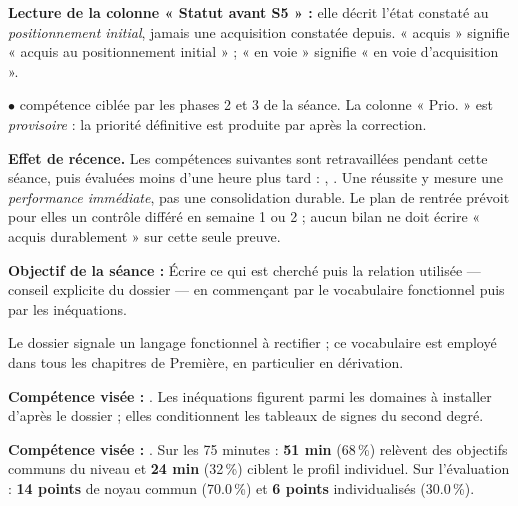 \documentclass[10pt,a4paper]{article}
\begin{document}
\par\vspace{1mm}\small\textbf{Lecture de la colonne « Statut avant S5 » :} elle décrit l'état constaté au \emph{positionnement initial}, jamais une acquisition constatée depuis. « acquis » signifie « acquis au positionnement initial » ; « en voie » signifie « en voie d'acquisition ».
\par\small$\bullet$ compétence ciblée par les phases 2 et 3 de la séance. La colonne « Prio. » est \emph{provisoire} : la priorité définitive est produite par  après la correction.
\begin{warningbox}\textbf{Effet de récence.} Les compétences suivantes sont retravaillées pendant cette séance, puis évaluées moins d'une heure plus tard : , . Une réussite y mesure une \emph{performance immédiate}, pas une consolidation durable. Le plan de rentrée prévoit pour elles un contrôle différé en semaine 1 ou 2 ; aucun bilan ne doit écrire « acquis durablement » sur cette seule preuve.\end{warningbox}
\begin{goalbox}\textbf{Objectif de la séance :} Écrire ce qui est cherché puis la relation utilisée — conseil explicite du dossier — en commençant par le vocabulaire fonctionnel puis par les inéquations.\end{goalbox}
Le dossier signale un langage fonctionnel à rectifier ; ce vocabulaire est employé dans tous les chapitres de Première, en particulier en dérivation.
\par\vspace{1mm}\textbf{Compétence visée :} .
Les inéquations figurent parmi les domaines à installer d'après le dossier ; elles conditionnent les tableaux de signes du second degré.
\par\vspace{1mm}\textbf{Compétence visée :} .
Sur les 75 minutes : \textbf{51 min} (68\,\%) relèvent des objectifs communs du niveau et \textbf{24 min} (32\,\%) ciblent le profil individuel. Sur l'évaluation : \textbf{14 points} de noyau commun (70.0\,\%) et \textbf{6 points} individualisés (30.0\,\%).
\end{document}
